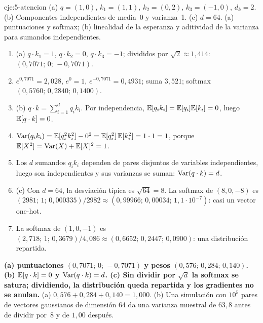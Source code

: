 \begin{solucion}{eje:5-atencion}
\datos (a) $q=(1,0)$, $k_1=(1,1)$, $k_2=(0,2)$, $k_3=(-1,0)$, $d_k=2$. (b) Componentes independientes de media~0 y varianza~1. (c) $d=64$.
\planteamiento (a) puntuaciones y softmax; (b) linealidad de la esperanza y aditividad de la varianza para sumandos independientes.
\pasos
\begin{enumerate}[label=\arabic*.]
  \item (a) $q\cdot k_1=1$, $q\cdot k_2=0$, $q\cdot k_3=-1$; divididos por $\sqrt2\approx 1{,}414$: $(0{,}7071;\,0;\,-0{,}7071)$.
  \item $e^{0{,}7071}=2{,}028$, $e^{0}=1$, $e^{-0{,}7071}=0{,}4931$; suma $3{,}521$; softmax $(0{,}5760;\,0{,}2840;\,0{,}1400)$.
  \item (b) $q\cdot k=\sum_{i=1}^{d}q_ik_i$. Por independencia, $\mathbb{E}[q_ik_i]=\mathbb{E}[q_i]\mathbb{E}[k_i]=0$, luego $\mathbb{E}[q\cdot k]=0$.
  \item $\operatorname{Var}(q_ik_i)=\mathbb{E}[q_i^{2}k_i^{2}]-0^{2}=\mathbb{E}[q_i^{2}]\,\mathbb{E}[k_i^{2}]=1\cdot 1=1$, porque $\mathbb{E}[X^{2}]=\operatorname{Var}(X)+\mathbb{E}[X]^{2}=1$.
  \item Los $d$ sumandos $q_ik_i$ dependen de pares disjuntos de variables independientes, luego son independientes y sus varianzas se suman: $\operatorname{Var}(q\cdot k)=d$.
  \item (c) Con $d=64$, la desviación típica es $\sqrt{64}=8$. La softmax de $(8,0,-8)$ es $(2981;\,1;\,0{,}000335)/2982\approx(0{,}99966;\,0{,}00034;\,1{,}1\cdot 10^{-7})$: casi un vector one-hot.
  \item La softmax de $(1,0,-1)$ es $(2{,}718;\,1;\,0{,}3679)/4{,}086\approx(0{,}6652;\,0{,}2447;\,0{,}0900)$: una distribución repartida.
\end{enumerate}
\resultado \textbf{(a) puntuaciones $(0{,}7071;\,0;\,-0{,}7071)$ y pesos $(0{,}576;\,0{,}284;\,0{,}140)$. (b) $\mathbb{E}[q\cdot k]=0$ y $\operatorname{Var}(q\cdot k)=d$. (c) Sin dividir por $\sqrt d$ la softmax se satura; dividiendo, la distribución queda repartida y los gradientes no se anulan.}
\comprobacion (a) $0{,}576+0{,}284+0{,}140=1{,}000$. (b) Una simulación con $10^{5}$ pares de vectores gaussianos de dimensión 64 da una varianza muestral de $63{,}8$ antes de dividir por~8 y de $1{,}00$ después.
\end{solucion}
